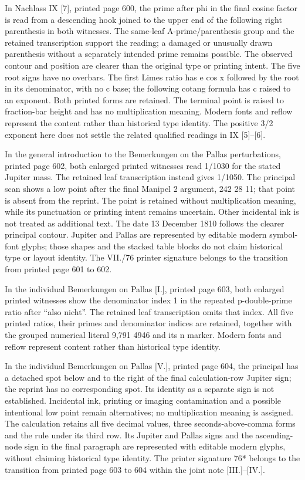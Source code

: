 In Nachlass IX [7], printed page 600, the prime after phi in the final cosine factor is read from a descending hook joined to the upper end of the following right parenthesis in both witnesses. The same-leaf A-prime/parenthesis group and the retained transcription support the reading; a damaged or unusually drawn parenthesis without a separately intended prime remains possible. The observed contour and position are clearer than the original type or printing intent. The five root signs have no overbars. The first Limes ratio has e cos x followed by the root in its denominator, with no c base; the following cotang formula has c raised to an exponent. Both printed forms are retained. The terminal point is raised to fraction-bar height and has no multiplication meaning. Modern fonts and reflow represent the content rather than historical type identity. The positive 3/2 exponent here does not settle the related qualified readings in IX [5]--[6].

In the general introduction to the Bemerkungen on the Pallas perturbations, printed page 602, both enlarged printed witnesses read 1/1030 for the stated Jupiter mass. The retained leaf transcription instead gives 1/1050. The principal scan shows a low point after the final Manipel 2 argument, 242 28 11; that point is absent from the reprint. The point is retained without multiplication meaning, while its punctuation or printing intent remains uncertain. Other incidental ink is not treated as additional text. The date 13 December 1810 follows the clearer principal contour. Jupiter and Pallas are represented by editable modern symbol-font glyphs; those shapes and the stacked table blocks do not claim historical type or layout identity. The VII./76 printer signature belongs to the transition from printed page 601 to 602.

In the individual Bemerkungen on Pallas [I.], printed page 603, both enlarged printed witnesses show the denominator index 1 in the repeated p-double-prime ratio after “also nicht”. The retained leaf transcription omits that index. All five printed ratios, their primes and denominator indices are retained, together with the grouped numerical literal 9,791 4946 and its n marker. Modern fonts and reflow represent content rather than historical type identity.

In the individual Bemerkungen on Pallas [V.], printed page 604, the principal has a detached spot below and to the right of the final calculation-row Jupiter sign; the reprint has no corresponding spot. Its identity as a separate sign is not established. Incidental ink, printing or imaging contamination and a possible intentional low point remain alternatives; no multiplication meaning is assigned. The calculation retains all five decimal values, three seconds-above-comma forms and the rule under its third row. Its Jupiter and Pallas signs and the ascending-node sign in the final paragraph are represented with editable modern glyphs, without claiming historical type identity. The printer signature 76* belongs to the transition from printed page 603 to 604 within the joint note [III.]–[IV.].

